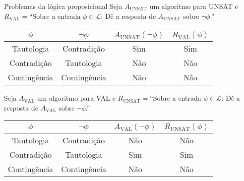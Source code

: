 \documentclass{beamer}
\begin{document}
\begin{frame}{Problemas da lógica proposicional}
	Seja $A_{\text{UNSAT}}$ um algoritmo para UNSAT e $R_{\text{VAL}} =$\break ``Sobre a entrada $\phi \in \mathcal{L}$: Dê a resposta de $A_{\text{UNSAT}}$ sobre $\neg \phi$.''
	
	\begin{center}
		\begin{tabular}{c|c|c|c}
			$\phi$       & $\neg \phi$  & $A_{\text{UNSAT}}(\neg \phi)$ & $R_{\text{VAL}}(\phi)$ \\ \hline
			Tautologia   & Contradição  & Sim                            & Sim                          \\
			Contradição  & Tautologia   & Não                            & Não                          \\
			Contingência & Contingência & Não                            & Não                         
		\end{tabular}
	\end{center}
	
	\pause Seja $A_{\text{VAL}}$ um algoritmo para VAL e $R_{\text{UNSAT}} =$\break ``Sobre a entrada $\phi \in \mathcal{L}$: Dê a resposta de $A_{\text{VAL}}$ sobre $\neg \phi$.''
	
	\begin{center}
		\begin{tabular}{c|c|c|c}
			$\phi$       & $\neg \phi$  & $A_{\text{VAL}}(\neg \phi)$ & $R_{\text{UNSAT}}(\phi)$ \\ \hline
			Tautologia   & Contradição  & Não                            & Não                          \\
			Contradição  & Tautologia   & Sim                            & Sim                          \\
			Contingência & Contingência & Não                            & Não                         
		\end{tabular}
	\end{center}
\end{frame}
\end{document}
